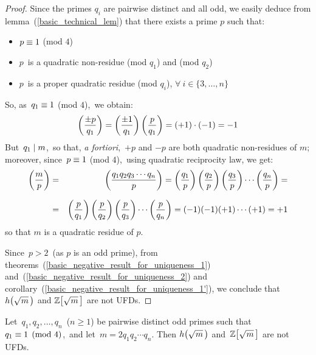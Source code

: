 \begin{proof}
%
Since the primes $q_i$ are pairwise distinct and all odd, we
easily deduce from lemma~(\ref{basic_technical_lem}) that there
exists a prime $p$ such that:

\begin{itemize}

\item $p \equiv 1$ (mod $4$)

\item $p$\, is a quadratic non-residue
(mod $q_1$) and (mod $q_2$)

\item $p$\, is a proper quadratic residue (mod $q_i$),
$\forall\: i \in \{3, \ldots, n\}$

\end{itemize}

So, as\, $q_1 \equiv 1$ (mod $4$),\, we obtain:
$$
\left(\frac{\pm{p}}{q_1}\right) = \left(\frac{\pm{1}}{q_1}\right)\left(\frac{p}{q_1}\right)
= (+1) \cdot (-1) = -1
$$
But \,$q_1 \mid m$,\, so that,
\emph{a fortiori},\, $+p$ and $-p$ are both
quadratic non-residues of $m$;\, moreover, since\,
$p \equiv 1$ (mod $4$),\, using quadratic
reciprocity law, we get:
%
{\setlength\arraycolsep{2pt}
\begin{eqnarray*}
\left(\frac{m}{p}\right) & = &\left(\frac{q_1 q_2 q_3 \cdots q_n}{p}\right) =
\left(\frac{q_1}{p}\right) \left(\frac{q_2}{p}\right) \left(\frac{q_3}{p}\right) \cdots
\left(\frac{q_n}{p}\right) = \\[7pt]
& = & \left(\frac{p}{q_1}\right) \left(\frac{p}{q_2}\right) \left(\frac{p}{q_3}\right) \cdots
\left(\frac{p}{q_n}\right) = (-1)(-1)(+1)\cdots(+1) = +1
\end{eqnarray*}}
{\flushleft
so that $m$ is a quadratic residue of $p$.}

Since\, $p > 2$\, (as $p$ is an odd prime), from
theorems~(\ref{basic_negative_result_for_uniqueness_1})
and~(\ref{basic_negative_result_for_uniqueness_2})
and corollary~(\ref{basic_negative_result_for_uniqueness_1'}),
we conclude that $\hh{m}$ and $\ZZ{m}$ are not UFDs.
%
\end{proof}


\begin{thm}\label{deeper_2}
Let \,$q_1, q_2, \ldots, q_n$\, ($n \geq 1$) be
pairwise distinct odd primes such that\, $q_1 \equiv 1 \pmod 4$,\,
and let\, $m = 2 q_1 q_2 \cdots q_n$.
Then $\hh{m}$ and \,$\ZZ{m}$ are not UFDs.
\end{thm}

